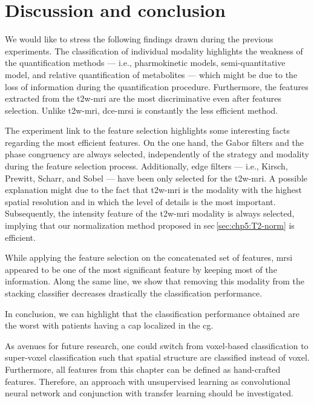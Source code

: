 \section{Discussion and conclusion}\label{sec:chp6:discussion}

We would like to stress the following findings drawn during the previous experiments.
The classification of individual modality highlights the weakness of the quantification methods --- i.e., pharmokinetic models, semi-quantitative model, and relative quantification of metabolites --- which might be due to the loss of information during the quantification procedure.
Furthermore, the features extracted from the \ac{t2w}-\ac{mri} are the most discriminative even after features selection.
Unlike \ac{t2w}-\ac{mri}, \ac{dce}-\ac{mrsi} is constantly the less efficient method.

The experiment link to the feature selection highlights some interesting facts regarding the most efficient features.
On the one hand, the Gabor filters and the phase congruency are always selected, independently of the strategy and modality during the feature selection process.
Additionally, edge filters --- i.e., Kirsch, Prewitt, Scharr, and Sobel --- have been only selected for the \ac{t2w}-\ac{mri}.
A possible explanation might due to the fact that \ac{t2w}-\ac{mri} is the modality with the highest spatial resolution and in which the level of details is the most important.
Subsequently, the intensity feature of the \ac{t2w}-\ac{mri} modality is always selected, implying that our normalization method proposed in \acs{sec}\,\ref{sec:chp5:T2-norm} is efficient.

While applying the feature selection on the concatenated set of features, \ac{mrsi} appeared to be one of the most significant feature by keeping most of the information.
Along the same line, we show that removing this modality from the stacking classifier decreases drastically the classification performance.

In conclusion, we can highlight that the classification performance obtained are the worst with patients having a \ac{cap} localized in the \ac{cg}. 

As avenues for future research, one could switch from voxel-based classification to super-voxel classification such that spatial structure are classified instead of voxel.
Furthermore, all features from this chapter can be defined as hand-crafted features.
Therefore, an approach with unsupervised learning as convolutional neural network and conjunction with transfer learning should be investigated.

